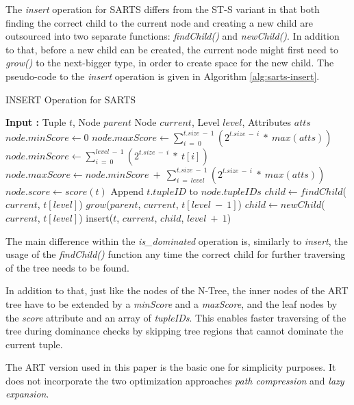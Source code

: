 The \textit{insert} operation for SARTS differs from the ST-S variant in that both finding the correct child to the current node and creating a new child are outsourced into two separate functions: \textit{findChild()} and \textit{newChild()}. In addition to that, before a new child can be created, the current node might first need to \textit{grow()} to the next-bigger type, in order to create space for the new child. The pseudo-code to the \textit{insert} operation is given in Algorithm \ref{alg:sarts-insert}.
\begin{algorithm}[h]
	\caption{INSERT Operation for SARTS} \label{alg:sarts-insert}
	\begin{algorithmic}[1]		
		\State \textbf{Input :} Tuple $t$, Node $parent$ Node $current$, Level $level$, Attributes $atts$
			\State $node.minScore \gets 0$
			\State $node.maxScore \gets \sum_{i~=~0}^{t.size~-~1}(2^{t.size~-~i}~*~max(atts))$
		\Else 
			\State $node.minScore \gets \sum_{i~=~0}^{level~-~1}(2^{t.size~-~i}~*~t[i])$
			\State $node.maxScore \gets node.minScore~+~\sum_{i~=~level}^{t.size~-~1}(2^{t.size~-~i}~*~max(atts))$
		\EndIf
				\State $node.score \gets score(t)$
			\EndIf
			\State Append $t.tupleID$ to $node.tupleIDs$
		\Else
			\State $child \gets findChild$($current$, $t[level]$)
					\State $grow$($parent$, $current$, $t[level~-~1]$)
				\EndIf
				\State $child \gets newChild$($current$, $t[level]$)
			\EndIf
			\State insert($t$, $current$, $child$, $level~+~1$)
		\EndIf
	\end{algorithmic}
\end{algorithm}

The main difference within the \textit{is\_dominated} operation is, similarly to \textit{insert}, the usage of the \textit{findChild()} function any time the correct child for further traversing of the tree needs to be found. 

In addition to that, just like the nodes of the N-Tree, the inner nodes of the ART tree have to be extended by a \textit{minScore} and a \textit{maxScore}, and the leaf nodes by the \textit{score} attribute and an array of \textit{tupleIDs}. This enables faster traversing of the tree during dominance checks by skipping tree regions that cannot dominate the current tuple. 

The ART version used in this paper is the basic one for simplicity purposes. It does not incorporate the two optimization approaches \textit{path compression} and \textit{lazy expansion}. 

